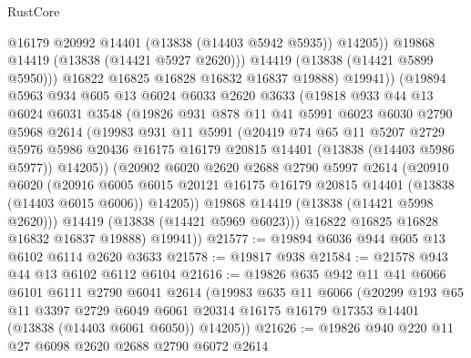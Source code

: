 \begin{lexlean}{RustCore}
\begin{coremodule}
                    @16179
                    @20992
                    @14401
                    (@13838 (@14403 @5942 @5935))
                    @14205))
                @19868
                @14419
                (@13838 (@14421 @5927 @2620)))
              @14419
              (@13838 (@14421 @5899 @5950)))
            @16822
            @16825
            @16828
            @16832
            @16837
            @19888)
          @19941))
      (@19894
        @5963
        @934
        @605
        @13
        @6024
        @6033
        @2620
        @3633
        (@19818
          @933
          @44
          @13
          @6024
          @6031
          @3548
          (@19826
            @931
            @878
            @11
            @41
            @5991
            @6023
            @6030
            @2790
            @5968
            @2614
            (@19983
              @931
              @11
              @5991
              (@20419
                @74
                @65
                @11
                @5207
                @2729
                @5976
                @5986
                @20436
                @16175
                @16179
                @20815
                @14401
                (@13838 (@14403 @5986 @5977))
                @14205))
            (@20902
              @6020
              @2620
              @2688
              @2790
              @5997
              @2614
              (@20910
                @6020
                (@20916
                  @6005
                  @6015
                  @20121
                  @16175
                  @16179
                  @20815
                  @14401
                  (@13838 (@14403 @6015 @6006))
                  @14205))
              @19868
              @14419
              (@13838 (@14421 @5998 @2620)))
            @14419
            (@13838 (@14421 @5969 @6023)))
          @16822
          @16825
          @16828
          @16832
          @16837
          @19888)
        @19941))
@21577 := @19894 @6036 @944 @605 @13 @6102 @6114 @2620 @3633
@21578 := @19817 @938
@21584 := @21578 @943 @44 @13 @6102 @6112 @6104
@21616 := @19826
    @635
    @942
    @11
    @41
    @6066
    @6101
    @6111
    @2790
    @6041
    @2614
    (@19983
      @635
      @11
      @6066
      (@20299
        @193
        @65
        @11
        @3397
        @2729
        @6049
        @6061
        @20314
        @16175
        @16179
        @17353
        @14401
        (@13838 (@14403 @6061 @6050))
        @14205))
@21626 := @19826 @940 @220 @11 @27 @6098 @2620 @2688 @2790 @6072 @2614

\end{coremodule}
\end{lexlean}
